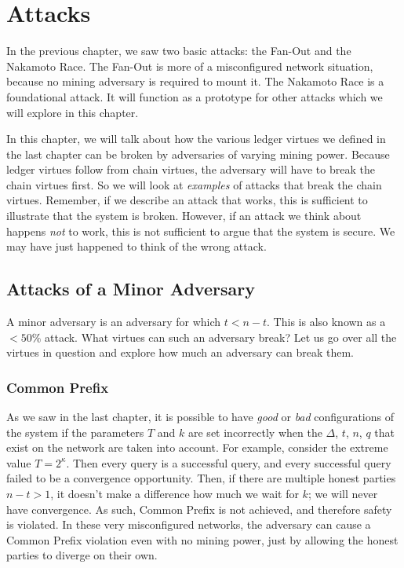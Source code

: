 \chapter{Attacks}\label{chapter:attacks}

In the previous chapter, we saw two basic attacks: the Fan-Out and the Nakamoto Race.
The Fan-Out is more of a misconfigured network situation, because no mining adversary
is required to mount it. The Nakamoto Race is a foundational attack.
It will function as a prototype for other attacks which we will explore in this chapter.

In this chapter, we will talk about how the various ledger virtues we defined in the
last chapter can be broken by adversaries of varying mining power. Because ledger virtues
follow from chain virtues, the adversary will have to break the chain virtues first.
So we will look at \emph{examples} of attacks that break the chain virtues. Remember,
if we describe an attack that works, this is sufficient to illustrate that the system
is broken. However, if an attack we think about happens \emph{not} to work, this is not
sufficient to argue that the system is secure. We may have just happened to think of
the wrong attack.

\section{Attacks of a Minor Adversary}

A minor adversary is an adversary for which $t < n - t$. This is also known as
a $< 50\%$ attack. What virtues can such an adversary break? Let us go over all the
virtues in question and explore how much an adversary can break them.

\subsection*{Common Prefix}
As we saw in the last chapter, it is possible to have \emph{good} or
\emph{bad} configurations of the system if the parameters $T$ and $k$ are set incorrectly
when the $\Delta$, $t$, $n$, $q$ that exist on the network are taken into account.
For example, consider the extreme value
$T = 2^\kappa$. Then every query is a successful query, and every successful query
failed to be a convergence opportunity. Then, if there are multiple honest parties
$n - t > 1$, it doesn't make a difference how much we wait for $k$; we will never
have convergence. As such, Common Prefix is not achieved, and therefore safety is
violated. In these very misconfigured networks, the adversary can cause a Common
Prefix violation even with no mining power, just by allowing the honest parties
to diverge on their own.

